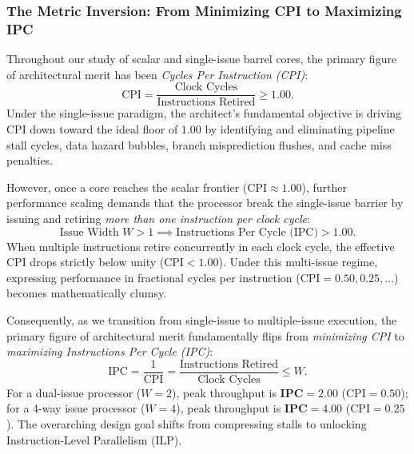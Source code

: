 \subsubsection{The Metric Inversion: From Minimizing CPI to Maximizing IPC}
Throughout our study of scalar and single-issue barrel cores, the primary figure of architectural merit has been \textit{Cycles Per Instruction (CPI)}:
\begin{equation}
\text{CPI} = \frac{\text{Clock Cycles}}{\text{Instructions Retired}} \ge 1.00.
\end{equation}
Under the single-issue paradigm, the architect's fundamental objective is driving CPI down toward the ideal floor of $1.00$ by identifying and eliminating pipeline stall cycles, data hazard bubbles, branch misprediction flushes, and cache miss penalties.

However, once a core reaches the scalar frontier ($\text{CPI} \approx 1.00$), further performance scaling demands that the processor break the single-issue barrier by issuing and retiring \textit{more than one instruction per clock cycle}:
\begin{equation}
\text{Issue Width } W > 1 \implies \text{Instructions Per Cycle (IPC)} > 1.00.
\end{equation}
When multiple instructions retire concurrently in each clock cycle, the effective CPI drops strictly below unity ($\text{CPI} < 1.00$). Under this multi-issue regime, expressing performance in fractional cycles per instruction ($\text{CPI} = 0.50, 0.25, \dots$) becomes mathematically clumsy. 

Consequently, as we transition from single-issue to multiple-issue execution, the primary figure of architectural merit fundamentally flips from \textit{minimizing CPI} to \textit{maximizing Instructions Per Cycle (IPC)}:
\begin{equation}
\text{IPC} = \frac{1}{\text{CPI}} = \frac{\text{Instructions Retired}}{\text{Clock Cycles}} \le W.
\end{equation}
For a dual-issue processor ($W = 2$), peak throughput is $\mathbf{\text{IPC} = 2.00}$ ($\text{CPI} = 0.50$); for a 4-way issue processor ($W = 4$), peak throughput is $\mathbf{\text{IPC} = 4.00}$ ($\text{CPI} = 0.25$). The overarching design goal shifts from compressing stalls to unlocking Instruction-Level Parallelism (ILP).

